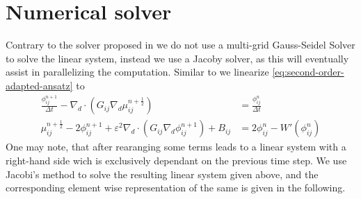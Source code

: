\documentclass{mimosis}
\begin{document}
\chapter{Numerical solver}
\label{sec:orge49ad6b}
Contrary to the solver proposed in \autocite{Ulmer_CHRelaxed_2024} we do not use a multi-grid Gauss-Seidel Solver to solve the linear system, instead we use a Jacoby solver, as this will eventually assist in parallelizing the computation.
Similar to \autocite{Ulmer_CHRelaxed_2024} we linearize \eqref{eq:second-order-adapted-ansatz} to
\begin{equation}
\begin{aligned}
\frac{\phi_{ij}^{n+1}}{\Delta t}  -  \nabla _d \cdot (G_{ij} \nabla_d \mu_{ij}^{n+\frac{1}{2}} ) &= \frac{ \phi_{ij}^n}{\Delta t}  \\
 \mu_{ij}^{n+\frac{1}{2}} - 2\phi_{ij}^{n+1} + \varepsilon^2  \nabla_d \cdot  (G_{ij} \nabla _d \phi_{ij}^{n+1} ) + B_{ij} &=2\phi _{ij}^n - W'(\phi_{ij}^n)
\end{aligned}
\end{equation}
One may note, that after rearanging some terms leads to a linear system with a right-hand side wich is exclusively dependant on the previous time step.
We use Jacobi's method to solve the resulting linear system given above, and the corresponding element wise representation of the same is given in the following.
\end{document}
